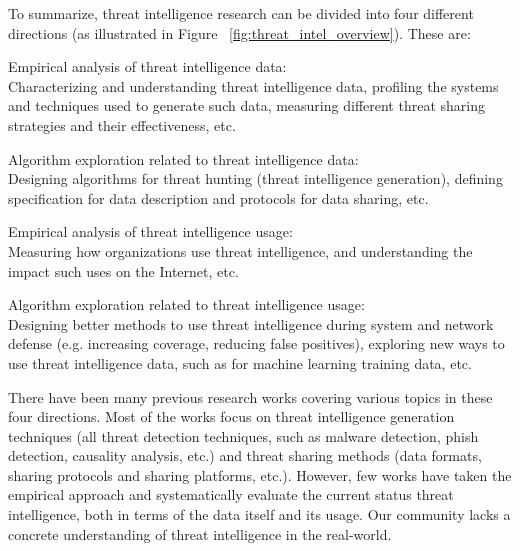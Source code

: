 To summarize, threat intelligence research can be divided into four 
different directions (as illustrated in Figure
~\ref{fig:threat_intel_overview}). These are:
\begin{prettylist}
    \item Empirical analysis of threat intelligence data: \\
    Characterizing and understanding threat intelligence data, profiling the 
    systems and techniques used to generate such data, measuring different 
    threat sharing strategies and their effectiveness, etc.
    
    \item Algorithm exploration related to threat intelligence data: \\
    Designing algorithms for threat hunting (threat intelligence generation),
    defining specification for data description and protocols for data 
    sharing, etc.
    
    \item Empirical analysis of threat intelligence usage: \\
    Measuring how organizations use threat intelligence, and understanding
    the impact such uses on the Internet, etc.
    
    \item Algorithm exploration related to threat intelligence usage: \\
    Designing better methods to use threat intelligence during system and 
    network defense (e.g. increasing coverage, reducing false positives),
    exploring new ways to use threat intelligence data, such as for machine
    learning training data, etc.
\end{prettylist}

There have been many previous research works covering various topics in these
four directions. Most of the works focus on threat intelligence generation
techniques (all threat detection techniques, such as malware detection, phish 
detection, causality analysis, etc.) and threat sharing methods (data formats, 
sharing protocols and sharing platforms, etc.). However, few works have taken
the empirical approach and systematically evaluate the current status threat
intelligence, both in terms of the data itself and its usage. Our community 
lacks a concrete understanding of threat intelligence in the real-world.

